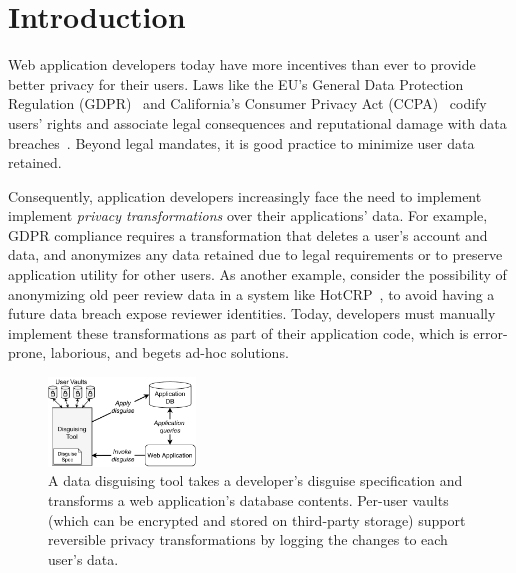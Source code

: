 \section{Introduction}
Web application developers today have more incentives than ever to provide better privacy for their
users.
%
Laws like the EU's General Data Protection Regulation (GDPR)~\cite{eu:gdpr} and California's
Consumer Privacy Act (CCPA)~\cite{ca:privacy-act} codify users' rights and associate legal
consequences and reputational damage with data breaches~\cite{breach:amazon,
breach:twitter, breach:fb, breach:marriott, breach:quora}.
%
Beyond legal mandates, it is good practice to minimize user data retained.
%

%
Consequently, application developers increasingly face the need to implement implement
\emph{privacy transformations} over their applications' data.
%
For example, GDPR compliance requires a transformation that deletes a user's account and
data, and anonymizes any data retained due to legal requirements or to preserve
application utility for other users.
%
As another example, consider the possibility of anonymizing old peer review data in a 
system like HotCRP~\cite{hotcrp}, to avoid having a future data breach expose reviewer
identities.
%
Today, developers must manually implement these transformations as part of their application
code, which is error-prone, laborious, and begets ad-hoc solutions.
%

%
%

\begin{figure}[t]
    \centering
    \includegraphics[width=0.35\textwidth]{img/disguise_tool}
    \caption{A data disguising tool takes a developer's disguise specification and transforms
	     a web application's database contents. Per-user vaults
	     (which can be encrypted and stored on third-party storage) support reversible
	     privacy transformations by logging the changes to each user's data.}
    \label{fig:tool}
\end{figure}

